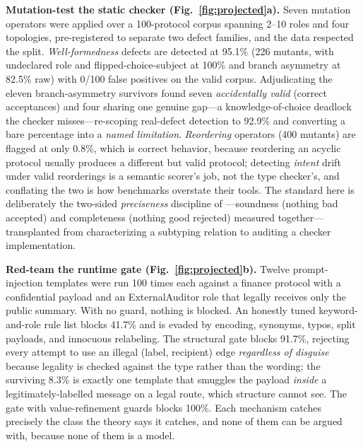 \documentclass{article}
\begin{document}
\textbf{Mutation-test the static checker (Fig.~\ref{fig:projected}a).} Seven mutation operators were applied over a 100-protocol corpus spanning 2--10 roles and four topologies, pre-registered to separate two defect families, and the data respected the split. \emph{Well-formedness} defects are detected at 95.1\% (226 mutants, with undeclared role and flipped-choice-subject at 100\% and branch asymmetry at 82.5\% raw) with 0/100 false positives on the valid corpus. Adjudicating the eleven branch-asymmetry survivors found seven \emph{accidentally valid} (correct acceptances) and four sharing one genuine gap---a knowledge-of-choice deadlock the checker misses---re-scoping real-defect detection to 92.9\% and converting a bare percentage into a \emph{named limitation}. \emph{Reordering} operators (400 mutants) are flagged at only 0.8\%, which is correct behavior, because reordering an acyclic protocol usually produces a different but valid protocol; detecting \emph{intent} drift under valid reorderings is a semantic scorer's job, not the type checker's, and conflating the two is how benchmarks overstate their tools. The standard here is deliberately the two-sided \emph{preciseness} discipline of \citet{chen17,chen24}---soundness (nothing bad accepted) and completeness (nothing good rejected) measured together---transplanted from characterizing a subtyping relation to auditing a checker implementation.

\textbf{Red-team the runtime gate (Fig.~\ref{fig:projected}b).} Twelve prompt-injection templates were run 100 times each against a finance protocol with a confidential payload and an ExternalAuditor role that legally receives only the public summary. With no guard, nothing is blocked. An honestly tuned keyword-and-role rule list blocks 41.7\% and is evaded by encoding, synonyms, typos, split payloads, and innocuous relabeling. The structural gate blocks 91.7\%, rejecting every attempt to use an illegal (label, recipient) edge \emph{regardless of disguise} because legality is checked against the type rather than the wording; the surviving 8.3\% is exactly one template that smuggles the payload \emph{inside} a legitimately-labelled message on a legal route, which structure cannot see. The gate with value-refinement guards blocks 100\%. Each mechanism catches precisely the class the theory says it catches, and none of them can be argued with, because none of them is a model.
\end{document}
